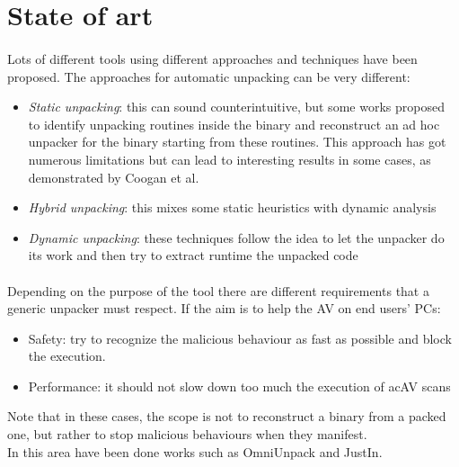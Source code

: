 \section{State of art}
\paragraph{}
Lots of different tools using different approaches and techniques have been proposed. 
The approaches for automatic unpacking can be very different:
\begin{itemize}
\item \textit{Static unpacking}: this can sound counterintuitive, but some works proposed to identify unpacking routines inside the binary and reconstruct an ad hoc unpacker for the binary starting from these routines. This approach has got numerous limitations but can lead to interesting results in some cases, as demonstrated by Coogan et al.\cite{coogan}
\item \textit{Hybrid unpacking}: this mixes some static heuristics with dynamic analysis
\item \textit{Dynamic unpacking}: these techniques follow the idea to let the unpacker do its work and then try to extract runtime the unpacked code
\end{itemize}
\paragraph{}
Depending on the purpose of the tool there are different requirements that a generic unpacker must respect. If the aim is to help the \ac{AV} on end users' PCs:
\begin{itemize}
\item Safety: try to recognize the malicious behaviour as fast as possible and block the execution.
\item Performance: it should not slow down too much the execution of ac{AV} scans
\end{itemize}
Note that in these cases, the scope is not to reconstruct a binary from a packed one, but rather to stop malicious behaviours when they manifest. \\
In this area have been done works such as OmniUnpack and JustIn.
